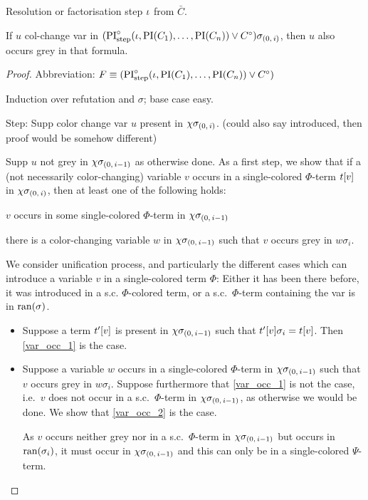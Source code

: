 \documentclass[,%
	draft=false,%
	numbers=noendperiod
	12pt,
	a4paper,
	oneside,%
	openany,
]{memoir}
\newcommand{\inv}{\ensuremath{\chi}}
\begin{document}
\begin{lemma}
	\label{lemma:col_change}
	Resolution or factorisation step $\iota$ from $\bar C$.

	If $u$ col-change var in $(\operatorname{PI}^{\circ}_{\mathrm{step}}(\iota, \operatorname{PI}(C_1), \dots, \operatorname{PI}(C_n)) \lor C^\circ)\sigma_{(0,\,i)}$, then $u$ also occurs grey in that formula.
\end{lemma}
\begin{proof}
	Abbreviation: $F \equiv (\operatorname{PI}^{\circ}_{\mathrm{step}}(\iota, \operatorname{PI}(C_1), \dots, \operatorname{PI}(C_n)) \lor C^\circ)$

	Induction over refutation and $\sigma$; base case easy.

	Step:
	Supp color change var $u$ present in 
	$\inv\sigmazi$. (could also say introduced, then proof would be somehow different)

	Supp $u$ not grey in 
	$\inv\sigmazmi$ as otherwise done.
	As a first step, we show that if a (not necessarily color-changing) variable $v$ occurs in a single-colored $\Phi$-term $t[v]$ in $\inv\sigmazi$,
	then at least one of the following holds:
	\begin{compactenum}
	\item $v$ occurs in some single-colored $\Phi$-term in $\inv\sigmazmi$ \label{var_occ_1}
	\item there is a color-changing variable $w$ in $\inv\sigmazmi$ such that $v$ occurs grey in $w\sigma_i$.  \label{var_occ_2}
	\end{compactenum}
	We consider unification process, and particularly the different cases which can introduce a variable $v$ in a single-colored term $\Phi$: Either it has been there before, it was introduced in a s.c. $\Phi$-colored term, or a s.c.\ $\Phi$-term containing the var is in $\operatorname{ran}(\sigma)$.
	\begin{itemize}
		\item
			Suppose a term $t'[v]$ is present in $\inv\sigmazmi$ such that $t'[v]\sigma_i = t[v]$.
			Then \ref{var_occ_1} is the case.
		\item
			Suppose a variable $w$ occurs in a single-colored $\Phi$-term in $\inv\sigmazmi$ such that $v$ occurs grey in $w\sigma_i$.
			Suppose furthermore that \ref{var_occ_1} is not the case, i.e.\ $v$ does not occur in a s.c.\ $\Phi$-term in $\inv\sigmazmi$, as otherwise we would be done.
			We show that \ref{var_occ_2} is the case.

			As $v$ occurs neither grey nor in a s.c.\ $\Phi$-term in $\inv\sigmazmi$ but occurs in $\operatorname{ran}(\sigma_i)$, it must occur in $\inv\sigmazmi$ and this can only be in a single-colored $\Psi$-term.


\end{itemize}
\end{proof}
\end{document}
